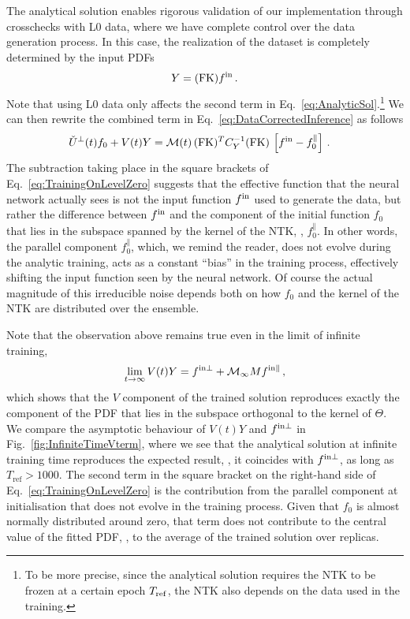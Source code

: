 The analytical solution enables rigorous validation of our implementation
through crosschecks with L0 data, where we have complete control over the data
generation process. In this case, the realization of the dataset is completely
determined by the input PDFs
\begin{equation}
    \label{eq:DataL0NoIndices}
    Y = (\mathrm{FK}) f^{\rm in}\, .
\end{equation}
Note that using L0 data only affects the second term in
Eq.~\eqref{eq:AnalyticSol}.\footnote{To be more precise, since the analytical
solution requires the NTK to be frozen at a certain epoch $T_{\rm ref}$, the NTK
also depends on the data used in the training.} We can then rewrite the combined
term in Eq.~\eqref{eq:DataCorrectedInference} as follows
\begin{align}
  \label{eq:TrainingOnLevelZero}
  \check{U}^\perp(t) f_0 + V(t) Y 
    &= \mathcal{M}(t)\, (\mathrm{FK})^T C_{Y}^{-1} (\mathrm{FK})\, 
      \left[f^{\rm in} - f_{0}^\parallel\right]\, .
\end{align}
The subtraction taking place in the square brackets of
Eq.~\eqref{eq:TrainingOnLevelZero} suggests that the effective function that
the neural network actually sees is not the input function $f^{\rm in}$ used to
generate the data, but rather the difference between $f^{\rm in}$ and the component of
the initial function $f_0$ that lies in the subspace spanned by the kernel of
the NTK, \ie, $f_0^\parallel$. In other words, the parallel component
$f_0^\parallel$, which, we remind the reader, does not evolve during the analytic training,
acts as a constant ``bias'' in the training process, effectively shifting the 
input function seen by the neural network. Of course the actual magnitude of
this irreducible noise depends both on how $f_0$ and the kernel of the NTK are
distributed over the ensemble. 

Note that the observation above remains true even in the limit of infinite
training, 
\begin{align}
    \label{eq:LevelZeroClosureInfiniteTraining}
    \lim_{t\to\infty} V(t) Y = f^{\rm in \perp} + \mathcal{M}_{\infty} M f^{\rm in \parallel}\, ,
\end{align}
which shows that the $V$ component of the trained solution reproduces exactly
the component of the PDF that lies in the subspace orthogonal to the kernel of
$\Theta$. We compare the asymptotic behaviour of $V(t) Y$ and $f^{\rm in \perp}$ in
Fig.~\ref{fig:InfiniteTimeVterm}, where we see that the analytical solution at
infinite training time reproduces the expected result, \ie, it coincides 
with $f^{\rm in \perp}$, as long as $T_{\mathrm{ref}}> 1000$. The second term in 
the square bracket on the right-hand side of
Eq.~\eqref{eq:TrainingOnLevelZero} is the contribution from the parallel
component at initialisation that does not evolve in the training process. Given
that $f_0$ is almost normally distributed around zero, that term does not
contribute to the central value of the fitted PDF, \ie, to the average of the
trained solution over replicas. 

